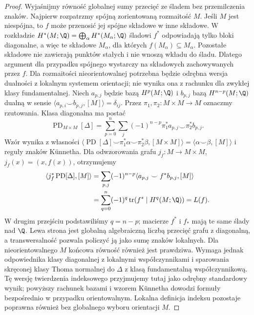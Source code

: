 \begin{proof}
Wyjaśnijmy równość globalnej sumy przecięć ze śladem
bez przemilczenia znaków. Najpierw rozpatrzmy spójną zorientowaną rozmaitość $M$.
Jeśli $M$ jest niespójna, to $f$ może przenosić jej spójne
składowe w inne składowe. W rozkładzie
$H^*(M;\Q)=\bigoplus_{\alpha}H^*(M_\alpha;\Q)$
śladowi $f^*$ odpowiadają tylko bloki diagonalne, a więc
te składowe $M_\alpha$, dla których $f(M_\alpha)\subseteq M_\alpha$.
Pozostałe składowe nie zawierają punktów stałych i nie
wnoszą wkładu do śladu. Dlatego argument dla przypadku
spójnego wystarczy na składowych zachowywanych przez $f$.
Dla rozmaitości nieorientowalnej potrzebna będzie odrębna
wersja dualności z lokalnym systemem orientacji;
nie wynika ona z rachunku dla zwykłej klasy fundamentalnej.
Niech $a_{p,j}$ będzie bazą $H^p(M;\Q)$ i $b_{p,j}$
bazą $H^{n-p}(M;\Q)$ dualną w sensie
$\langle a_{p,i}\smile b_{p,j},[M]\rangle=\delta_{ij}$.
Przez $\pi_1,\pi_2:M\times M\to M$ oznaczmy rzutowania.
Klasa diagonalna ma postać
\[
 \operatorname{PD}_{M\times M}[\Delta]
 =\sum_{p=0}^{n}\sum_j(-1)^{n-p}
 \pi_1^*a_{p,j}\smile\pi_2^*b_{p,j}.
\]
Wzór wynika z własności
$\langle\operatorname{PD}[\Delta]\smile
 \pi_1^*\alpha\smile\pi_2^*\beta,[M\times M]\rangle
 =\langle\alpha\smile\beta,[M]\rangle$
i reguły znaków Künnetha.
Dla odwzorowania grafu $j_f:M\to M\times M$,
$j_f(x)=(x,f(x))$, otrzymujemy
\begin{align*}
 \langle j_f^*\operatorname{PD}[\Delta],[M]\rangle
 &=\sum_{p,j}(-1)^{n-p}
 \langle a_{p,j}\smile f^*b_{p,j},[M]\rangle\\
 &=\sum_{q=0}^n(-1)^q
 \operatorname{tr}(f^*\mid H^q(M;\Q))=L(f).
\end{align*}
W drugim przejściu podstawiliśmy $q=n-p$;
macierze $f^*$ i $f_*$ mają te same ślady nad $\Q$.
Lewa strona jest globalną algebraiczną liczbą
przecięć grafu z diagonalną, a transwersalność
pozwala policzyć ją jako sumę znaków lokalnych.
Dla nieorientowalnego $M$ końcowa równość również jest
prawdziwa. Wymaga jednak odpowiednika klasy diagonalnej
z lokalnymi współczynnikami i sparowania skręconej
klasy Thoma normalnej do $\Delta$ z klasą fundamentalną
współczynnikową. Tę wersję twierdzenia indeksowego
przyjmujemy tutaj jako odrębny standardowy wynik;
powyższy rachunek bazami i wzorem Künnetha dowodzi
formuły bezpośrednio w przypadku orientowalnym.
Lokalna definicja indeksu pozostaje poprawna również
bez globalnego wyboru orientacji $M$.
\end{proof}

